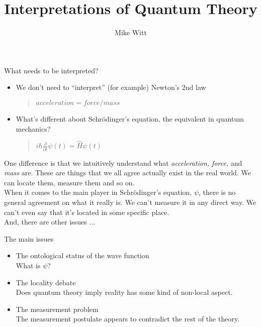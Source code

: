 \documentclass[9pt,usenames,dvipsnames]{beamer}
\author{Mike Witt}
\title{Interpretations of Quantum Theory}
\institute{Physics Cafe}
\begin{document}
\begin{frame}
\titlepage
\end{frame}


\begin{frame}[t]{What needs to be interpreted?}
\begin{itemize}
\vspace{8pt}
\item 
We don't need to ``interpret'' (for example) Newton's 2nd law
\begin{quote}
\vspace{8pt}
$acceleration = force / mass$
\end{quote}
\vspace{0pt}
\item
What's different about Schr\"odinger's equation, the equivalent
in quantum mechanics?
\begin{quote}
\vspace{8pt}
$i\hbar \frac{\partial}{\partial t}\psi(t) = \hat{H} \psi(t)$
\end{quote}
\end{itemize}

\vspace{2pt}
One difference is that we intuitively understand what 
{\it acceleration, force,} and {\it mass} are. These are things that we all
agree actually exist in the real world. We can locate them, measure them
and so on.
\vspace{12pt}\\
When it comes to the main player in Schr\"odinger's equation, $\psi$,
there is no general agreement on what it really is. We can't measure it in
any direct way. We can't even say that it's located in some specific place.
\vspace{12pt}\\
And, there are other issues ...
\end{frame}

\begin{frame}[t]{The main issues}
\begin{itemize}

\vspace{8pt}
\item 
The ontological status of the wave function
\vspace{6pt}\\
What is $\psi$?

\vspace{12pt}
\item
The locality debate
\vspace{6pt}\\
Does quantum theory imply reality has some kind of non-local aspect.

\vspace{12pt}
\item
The measurement problem
\vspace{6pt}\\
The measurement postulate appears to contradict the rest of the theory.
\end{itemize}
\end{frame}
\end{document}

